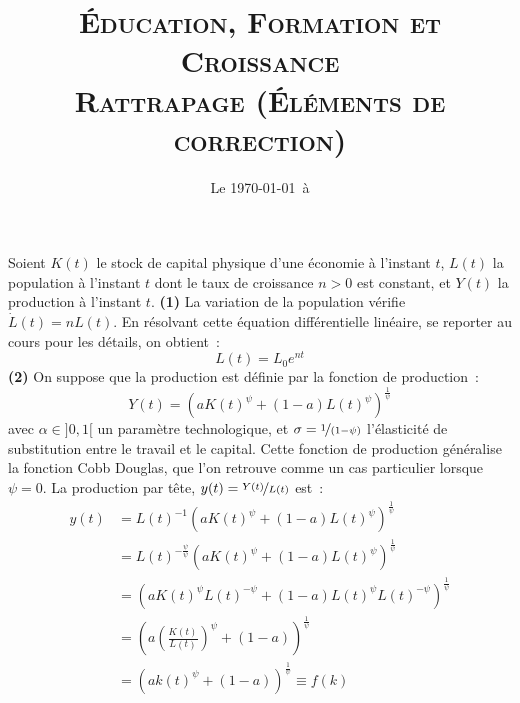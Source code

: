 \documentclass[11pt,a4paper,notitlepage]{article}
\begin{document}
\title{\textsc{Éducation, Formation et Croissance\\ \small{Rattrapage (Éléments de correction)}}}
\date{Le \today\ à \thistime}

\maketitle
\thispagestyle{empty}

Soient $K(t)$ le stock de capital physique d'une économie à l'instant
$t$, $L(t)$ la population à l'instant $t$ dont le taux de croissance
$n>0$ est constant, et $Y(t)$ la production à l'instant
$t$. \textbf{(1)} La variation de la population vérifie $\dot{L}(t) = n L(t)$. En résolvant cette équation différentielle linéaire, se reporter au cours pour les détails, on obtient :
\[
 L(t) = L_0e^{nt}
\]
\textbf{(2)} On suppose que la
production est définie par la fonction de production :
\[
Y(t) = \left(aK(t)^{\psi} + (1-a)L(t)^{\psi}\right)^{\frac{1}{\psi}}
\]
avec $\alpha\in]0,1[$ un paramètre technologique, et $\sigma=\nicefrac{1}{(1-\psi)}$ l'élasticité de substitution entre le travail et le capital. Cette fonction de production généralise la fonction Cobb Douglas, que l'on retrouve comme un cas particulier lorsque $\psi=0$. La production par tête, $y(t) = \nicefrac{Y(t)}{L(t)}$ est :
\[
  \begin{split}
    y(t) &= L(t)^{-1}\left(aK(t)^{\psi} + (1-a)L(t)^{\psi}\right)^{\frac{1}{\psi}}\\
    &= L(t)^{-\frac{\psi}{\psi}}\left(aK(t)^{\psi} + (1-a)L(t)^{\psi}\right)^{\frac{1}{\psi}}\\
    &= \left(aK(t)^{\psi}L(t)^{-\psi} + (1-a)L(t)^{\psi}L(t)^{-\psi}\right)^{\frac{1}{\psi}}\\
    &= \left(a\left(\frac{K(t)}{L(t)}\right)^{\psi} + (1-a)\right)^{\frac{1}{\psi}}\\
    &= \left(ak(t)^{\psi} + (1-a)\right)^{\frac{1}{\psi}} \equiv f(k)
  \end{split}
\]
\end{document}
